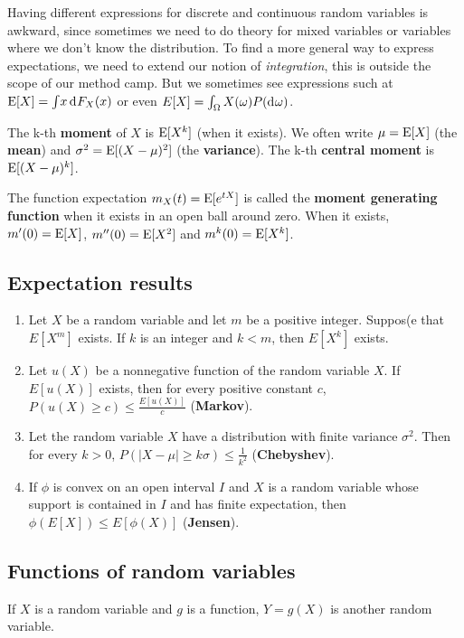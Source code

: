\documentclass[twoside]{article}
\begin{document}
Having different expressions for discrete and continuous random variables is awkward, since
sometimes we need to do theory for mixed variables or variables where we don't know the 
distribution. To find a more general way to express expectations, we need to extend
our notion of \emph{integration}, this is outside the scope of our method camp. But we sometimes
see expressions such at $\E[X]=\int\! x \rd F_X(x)$
or even $E[X]=\int_\Omega X(\omega) P(\rd \omega)$.

The k-th \textbf{moment} of $X$ is $\operatorname{E} [X^k]$ (when it exists).  We often write $\mu=\operatorname{E}[X]$ (the \textbf{mean}) and
$\sigma^2 = \operatorname{E}[(X-\mu)^2]$ (the \textbf{variance}). The k-th \textbf{central moment} 
is $\operatorname{E} [ (X-\mu)^k]$.

The function expectation $m_X(t)=\operatorname{E}[e^{tX}]$ is called the \textbf{moment generating function}
when it exists in an open ball around zero. When it exists, $m'(0)=\operatorname{E}[X]$, $m''(0)=\operatorname{E}[X^2]$ and
$m^k(0)=\operatorname{E}[X^k]$.

\subsection{Expectation results}
\begin{enumerate}
\item Let $X$ be a random variable and let $m$ be a positive integer. 
Suppos(e that $E[X^m]$ exists. If $k$ is an integer and $k < m$, then
$E[X^k]$ exists.
\item Let $u(X)$ be a nonnegative function of the random variable $X$. If
$E[u(X)]$ exists, then for every positive constant $c$,
$P(u(X)\geq c) \leq \frac{E[u(X)]}{c}$ (\textbf{Markov}).
\item Let the random variable $X$ have a distribution with
finite variance $\sigma^2$. Then for every $k>0$, 
$P(|X-\mu|\geq k\sigma) \leq \frac{1}{k^2}$ (\textbf{Chebyshev}).
\item If $\phi$ is convex on an open interval $I$ and $X$ is a random
variable whose support is contained in $I$ and has finite expectation,
then $ \phi(E[X]) \leq E[\phi(X)]$ (\textbf{Jensen}).




\end{enumerate}

\subsection{Functions of random variables}
If $X$ is a random variable and $g$ is a function, $Y=g(X)$ is another random variable.
\end{document}
